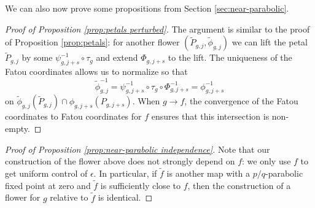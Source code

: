 \documentclass[12pt,letterpaper]{amsart}
\numberwithin{equation}{section}
\theoremstyle{remark}
\theoremstyle{definition}
\begin{document}
 	
 	
 	We can also now prove some propositions from Section \ref{sec:near-parabolic}.
 	
 	
 	
 	\begin{proof}[Proof of Proposition \ref{prop:petals perturbed}]
 		The argument is similar to  the proof of Proposition \ref{prop:petals}: for another flower $(\tilde P_{g, j}, \tilde \phi_{g, j})$ we can lift the petal $\tilde P_{g, j}$ by some  $\psi_{g, j+s}^{-1}\circ \tau_g$ and extend $\Phi_{g, j+s}$ to the lift. 
 		The uniqueness of the Fatou coordinates allows us to normalize so that 
 		$$\tilde \phi_{g, j}^{-1} = \psi_{g, j+s}^{-1}\circ \tau_g\circ \Phi_{g, j+s}^{-1} = \phi_{g, j+s}^{-1}$$
 		on $\tilde \phi_{g, j}(\tilde P_{g, j})\cap \phi_{g, j+s}(P_{g, j+s})$. When $g\to f$, the convergence of the Fatou coordinates to Fatou coordinates for $f$ ensures that this intersection is non-empty. 
 	\end{proof}
 	\begin{proof}[Proof of Proposition \ref{prop:near-parabolic independence}]
 		Note that our construction of the flower above does not strongly depend on $f$: we only use $f$ to get uniform control of $\epsilon$. In particular, if $\tilde{f}$ is another map with a $p/q$-parabolic fixed point at zero and $\tilde{f}$ is sufficiently close to $f$, then the construction of a flower for $g$ relative to $\tilde{f}$ is identical.
 	\end{proof}
\end{document}

